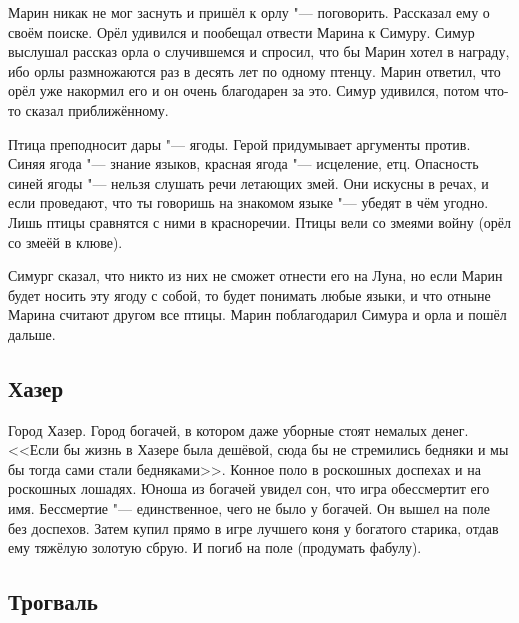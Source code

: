 Марин никак не мог заснуть и пришёл к орлу "--- поговорить.
Рассказал ему о своём поиске.
Орёл удивился и пообещал отвести Марина к Симуру.
Симур выслушал рассказ орла о случившемся и спросил, что бы Марин хотел в награду, ибо орлы размножаются раз в десять лет по одному птенцу.
Марин ответил, что орёл уже накормил его и он очень благодарен за это.
Симур удивился, потом что-то сказал приближённому.

Птица преподносит дары "--- ягоды.
Герой придумывает аргументы против.
Синяя ягода "--- знание языков, красная ягода "--- исцеление, етц.
Опасность синей ягоды "--- нельзя слушать речи летающих змей.
Они искусны в речах, и если проведают, что ты говоришь на знакомом языке "--- убедят в чём угодно.
Лишь птицы сравнятся с ними в красноречии.
Птицы вели со змеями войну (орёл со змеёй в клюве).

Симург сказал, что никто из них не сможет отнести его на Луна, но если Марин будет носить эту ягоду с собой, то будет понимать любые языки, и что отныне Марина считают другом все птицы.
Марин поблагодарил Симура и орла и пошёл дальше.

\subsection{Хазер}

Город Хазер.
Город богачей, в котором даже уборные стоят немалых денег.
<<Если бы жизнь в Хазере была дешёвой, сюда бы не стремились бедняки и мы бы тогда сами стали бедняками>>.
Конное поло в роскошных доспехах и на роскошных лошадях.
Юноша из богачей увидел сон, что игра обессмертит его имя.
Бессмертие "--- единственное, чего не было у богачей.
Он вышел на поле без доспехов.
Затем купил прямо в игре лучшего коня у богатого старика, отдав ему тяжёлую золотую сбрую.
И погиб на поле (продумать фабулу).

\subsection{Трогваль}

